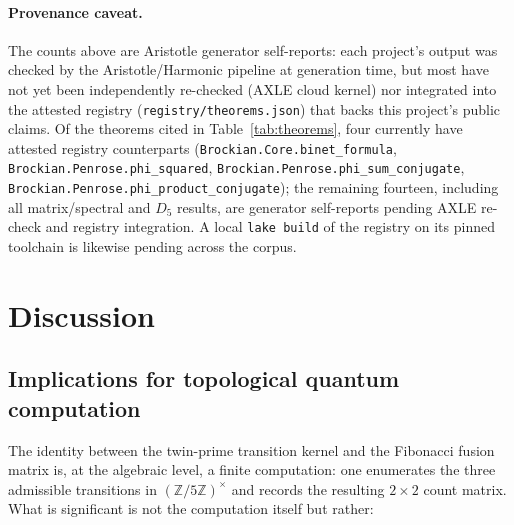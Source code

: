\documentclass[11pt,a4paper]{article}
\newcommand{\Z}{\mathbb{Z}}
\newcommand{\lean}[1]{\texttt{\small #1}}
\begin{document}
\paragraph{Provenance caveat.}
The counts above are Aristotle generator self-reports: each project's output
was checked by the Aristotle/Harmonic pipeline at generation time, but most
have not yet been independently re-checked (AXLE cloud kernel) nor integrated
into the attested registry (\texttt{registry/theorems.json}) that backs this
project's public claims. Of the theorems cited in
Table~\ref{tab:theorems}, four currently have attested registry counterparts
(\lean{Brockian.Core.binet\_formula}, \lean{Brockian.Penrose.phi\_squared},
\lean{Brockian.Penrose.phi\_sum\_conjugate},
\lean{Brockian.Penrose.phi\_product\_conjugate}); the remaining fourteen,
including all matrix/spectral and $D_5$ results, are generator self-reports
pending AXLE re-check and registry integration. A local \texttt{lake build}
of the registry on its pinned toolchain is likewise pending across the corpus.

\section{Discussion}\label{sec:discussion}

\subsection{Implications for topological quantum computation}

The identity between the twin-prime transition kernel and the Fibonacci fusion
matrix is, at the algebraic level, a finite computation: one enumerates the
three admissible transitions in $(\Z/5\Z)^\times$ and records the resulting
$2 \times 2$ count matrix. What is significant is not the computation itself
but rather:
\end{document}
